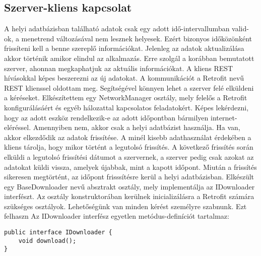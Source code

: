 \subsection*{Szerver-kliens kapcsolat}
\label{serverclient}
A helyi adatbázisban található adatok csak egy adott idő-intervallumban valid-ok, a menetrend változásával nem lesznek helyesek. Ezért bizonyos időközönként frissíteni kell a benne szereplő információkat. Jelenleg az adatok aktualizálása akkor történik amikor elindul az alkalmazás.
Erre szolgál a korábban bemutatott szerver, ahonnan megkaphatjuk az aktuális információkat.
A kliens REST hívásokkal képes beszerezni az új adatokat. 
A kommunikációt a Retrofit nevű REST klienssel oldottam meg. Segítségével könnyen lehet a szerver felé elküldeni a kéréseket. 
Elkészítettem egy NetworkManager osztály, mely felelős a Retrofit konfigurálásáért és egyéb hálozattal kapcsolatos feladatokért.
Képes lekérdezni, hogy az adott eszköz rendelkezik-e az adott időpontban bármilyen internet-eléréssel. Amennyiben nem, akkor csak a helyi adatbázist használja. Ha van, akkor elkezdődik az adatok frissítése.
A minél kisebb adathasználat érdekében a kliens tárolja, hogy mikor történt a legutolsó frissítés. A következő frissítés során elküldi a legutolsó frissítési dátumot a szervernek, a szerver pedig csak azokat az adatokat küldi vissza, amelyek újabbak, mint a kapott időpont.
Miután a frissítés sikeresen megtörtént, az időpont frisssítésre kerül a helyi adatbázisban.
Elkészült egy BaseDownloader nevű absztrakt osztály, mely implementálja az IDownloader interfészt.
Az osztály konstruktorában kerülnek inicializálásra a Retrofit számára szükséges osztályok.
Lehetőségünk van minden kérést személyre szabnunk. Ezt felhaszn
Az IDownloader interfész egyetlen metódus-definíciót tartalmaz:
\begin{lstlisting}
public interface IDownloader {
    void download();
}
\end{lstlisting}
\newpage